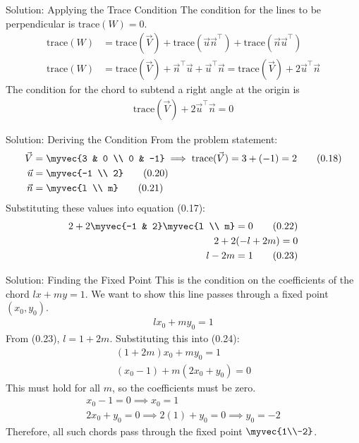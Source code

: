 \documentclass{beamer}
\numberwithin{equation}{section}
\theoremstyle{remark}
\begin{document}
\begin{frame}{Solution: Applying the Trace Condition}
The condition for the lines to be perpendicular is $\text{trace}( {W}) = 0$.
\begin{align}
\text{trace}( {W}) &= \text{trace}( {\vec{V}}) + \text{trace}(\vec{u}\vec{n}^\top) + \text{trace}(\vec{n}\vec{u}^\top) \tag{0.13}\\
\text{trace}( {W}) &= \text{trace}( {\vec{V}}) + \vec{n}^\top\vec{u} + \vec{u}^\top\vec{n} = \text{trace}( {\vec{V}}) + 2\vec{u}^\top\vec{n} \tag{0.14}
\end{align}
The condition for the chord to subtend a right angle at the origin is 
\begin{align}
\text{trace}( {\vec{V}}) + 2\vec{u}^\top\vec{n} = 0 \tag{0.17}
\end{align}
\end{frame}

\begin{frame}{Solution: Deriving the Condition}
From the problem statement:
\begin{align}
 {\vec{V}} &= \myvec{3 & 0 \\ 0 & -1} \implies \text{trace}( {\vec{V}}) = 3 + (-1) = 2 \tag{0.18} \\
\vec{u} &= \myvec{-1 \\ 2} \tag{0.20} \\
\vec{n} &= \myvec{l \\ m} \tag{0.21}
\end{align}
Substituting these values into equation (0.17):
\begin{align}
2 + 2\myvec{-1 & 2}\myvec{l \\ m} = 0 \tag{0.22}\\
2 + 2(-l + 2m) = 0 \\
l - 2m = 1 \tag{0.23}
\end{align}
\end{frame}

\begin{frame}{Solution: Finding the Fixed Point}
This is the condition on the coefficients of the chord $lx+my=1$. We want to show this line passes through a fixed point $(x_0, y_0)$.
\begin{align}
lx_0 + my_0 = 1 \tag{0.24}
\end{align}
From (0.23), $l = 1 + 2m$. Substituting this into (0.24):
\begin{align}
(1 + 2m)x_0 + my_0 = 1 \tag{0.25} \\
(x_0 - 1) + m(2x_0 + y_0) = 0 \tag{0.27}
\end{align}
This must hold for all $m$, so the coefficients must be zero.
\begin{align}
x_0 - 1 = 0 \implies x_0 = 1 \tag{0.28} \\
2x_0 + y_0 = 0 \implies 2(1) + y_0 = 0 \implies y_0 = -2 \tag{0.30}
\end{align}
Therefore, all such chords pass through the fixed point $\myvec{1\\-2}$.
\end{frame}
\end{document}
